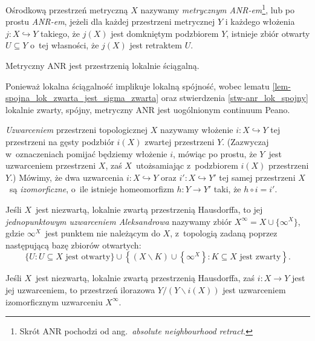 Ośrodkową przestrzeń metryczną $X$ nazywamy \textit{metrycznym \mbox{ANR-em}}\footnote{Skrót ANR pochodzi od ang.~\textit{absolute neighbourhood retract}.}, lub po prostu \textit{\mbox{ANR-em}}, jeżeli dla każdej przestrzeni metrycznej $Y$ i każdego włożenia $j\colon X\hookrightarrow Y$ takiego, że $j(X)$ jest domkniętym podzbiorem $Y$, istnieje zbiór otwarty $U\subseteq Y$ o~tej własności, że $j(X)$ jest retraktem $U$. 

\begin{stw}\label{stw-anr_lok_spojny}
Metryczny ANR jest przestrzenią lokalnie ściągalną.
\end{stw}
Ponieważ lokalna ściągalność implikuje lokalną spójność, wobec lematu \ref{lem-spojna_lok_zwarta_jest_sigma_zwarta} oraz stwierdzenia \ref{stw-anr_lok_spojny} lokalnie zwarty, spójny, metryczny ANR jest uogólnionym continuum Peano.\label{ANR_jest_continuum}

\textit{Uzwarceniem} przestrzeni topologicznej $X$ nazywamy włożenie $i\colon X\hookrightarrow Y$ tej przestrzeni na gęsty podzbiór $i(X)$ zwartej przestrzeni $Y$. 
(Zazwyczaj w~oznaczeniach pomijać będziemy włożenie $i$, mówiąc po prostu, że $Y$~jest uzwarceniem przestrzeni $X$, zaś $X$~utożsamiając z~podzbiorem $i(X)$ przestrzeni $Y$.)
Mówimy, że dwa uzwarcenia $i\colon X\hookrightarrow Y$ oraz $i'\colon X\hookrightarrow Y'$ tej samej przestrzeni $X$~są \textit{izomorficzne}, o~ile istnieje homeomorfizm $h\colon Y\to Y'$ taki, że $h\circ i=i'$. 

Jeśli $X$~jest niezwartą, lokalnie zwartą przestrzenią Hausdorffa, to jej \textit{jednopunktowym uzwarceniem Aleksandrowa} nazywamy zbiór $X^\infty=X\cup\{\infty^X\}$, gdzie $\infty^X$~jest punktem nie należącym do $X$, z~topologią zadaną poprzez następującą bazę zbiorów otwartych:
\[\bigl\{U:U\subseteq X \text{ jest otwarty}\bigr \}\cup \left\{(X\smallsetminus K)\cup \left\{\infty^X\right\}:K\subseteq X\text{ jest zwarty}\right\}.\]

\begin{lem}\label{lem-iloraz_homeomorficzny_jednopunktowemu}
Jeśli $X$~jest niezwartą, lokalnie zwartą przestrzenią Hausdorffa, zaś $i\colon X\to Y$ jest jej uzwarceniem, to przestrzeń ilorazowa $Y\big/ (Y\smallsetminus i(X))$ jest uzwarceniem izomorficznym uzwarceniu $X^\infty$.
\end{lem}

